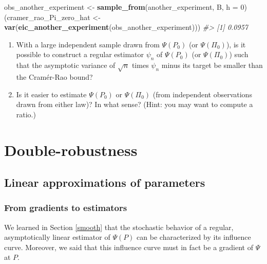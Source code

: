 \documentclass[11pt,openright,twoside]{book}
\newenvironment{Shaded}{\begin{snugshade}}{\end{snugshade}}
\newcommand{\CommentTok}[1]{\textcolor[rgb]{0.56,0.35,0.01}{\textit{#1}}}
\newcommand{\DataTypeTok}[1]{\textcolor[rgb]{0.13,0.29,0.53}{#1}}
\newcommand{\DecValTok}[1]{\textcolor[rgb]{0.00,0.00,0.81}{#1}}
\newcommand{\KeywordTok}[1]{\textcolor[rgb]{0.13,0.29,0.53}{\textbf{#1}}}
\newcommand{\NormalTok}[1]{#1}
\newcommand{\StringTok}[1]{\textcolor[rgb]{0.31,0.60,0.02}{#1}}
\theoremstyle{definition}
\theoremstyle{definition}
\theoremstyle{definition}
\theoremstyle{remark}
\begin{document}
\begin{Shaded}
\begin{Highlighting}[]
\NormalTok{obs_another_experiment <-}\StringTok{ }\KeywordTok{sample_from}\NormalTok{(another_experiment, B, }\DataTypeTok{h =} \DecValTok{0}\NormalTok{)}
\NormalTok{(cramer_rao_Pi_zero_hat <-}
\StringTok{   }\KeywordTok{var}\NormalTok{(}\KeywordTok{eic_another_experiment}\NormalTok{(obs_another_experiment)))}
\CommentTok{#> [1] 0.0957}
\end{Highlighting}
\end{Shaded}

\begin{enumerate}
\def\labelenumi{\arabic{enumi}.}
\setcounter{enumi}{2}
\item
  With a large independent sample drawn from \(\Psi(P_0)\) (or \(\Psi(\Pi_0)\)),
  is it possible to construct a regular estimator \(\psi_{n}\) of \(\Psi(P_0)\)
  (or \(\Psi(\Pi_0)\)) such that the asymptotic variance of \(\sqrt{n}\) times
  \(\psi_{n}\) minus its target be smaller than the Cramér-Rao bound?
\item
  Is it easier to estimate \(\Psi(P_{0})\) or \(\Psi(\Pi_{0})\) (from independent
  observations drawn from either law)? In what sense? (Hint: you may want to
  compute a ratio.)
\end{enumerate}

\hypertarget{double-robustness}{%
\chapter{Double-robustness}\label{double-robustness}}

\hypertarget{linear-approximation}{%
\section{Linear approximations of parameters}\label{linear-approximation}}

\hypertarget{from-gradients-to-estimators}{%
\subsection{From gradients to estimators}\label{from-gradients-to-estimators}}

We learned in Section \ref{smooth} that the stochastic behavior of a regular,
asymptotically linear estimator of \(\Psi(P)\) can be characterized by its
influence curve. Moreover, we said that this influence curve must in fact be a
gradient of \(\Psi\) at \(P\).
\end{document}
